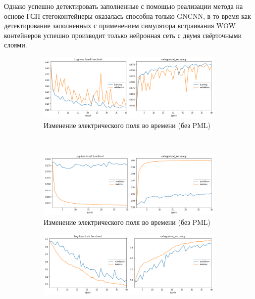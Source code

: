 Однако успешно детектировать заполненные с помощью реализации метода на основе ГСП стегоконтейнеры оказалась способна только GNCNN, в то время как детектирование заполненных с применением симулятора встраивания WOW контейнеров успешно производит только нейронная сеть с двумя свёрточными слоями.

\begin{figure}[p]
    \centering
    \begin{subfigure}[b]{0.485\textwidth}
        \includegraphics[width=\textwidth]{include/graphics/experimental_plots/grayscale/gncnn_hic}
                    \caption{Изменение электрического поля во времени (без PML)}
    \end{subfigure}
    ~
    \begin{subfigure}[b]{0.485\textwidth}
        \includegraphics[width=\textwidth]{include/graphics/experimental_plots/grayscale/mixed_hic}
                    \caption{Изменение электрического поля во времени (без PML)}
    \end{subfigure}
\bigskip
    \begin{subfigure}[b]{0.485\textwidth}
        \includegraphics[width=\textwidth]{include/graphics/experimental_plots/grayscale/gncnn_koch}

\end{subfigure}
\end{figure}
